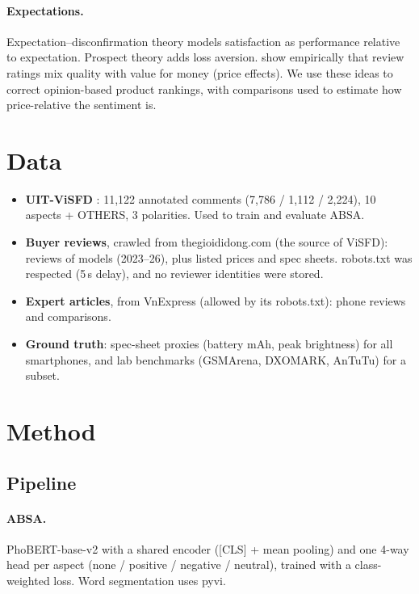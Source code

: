 \documentclass{article}
\begin{document}
\paragraph{Expectations.} Expectation--disconfirmation theory \citep{oliver1980} models satisfaction as performance relative to expectation.
Prospect theory \citep{kt1979} adds loss aversion. \citet{lihitt2010} show empirically that review ratings mix quality with value for money
(price effects). We use these ideas to correct opinion-based product rankings, with comparisons used to estimate how price-relative the sentiment is.

\section{Data}
\begin{itemize}
\item \textbf{UIT-ViSFD} \citep{visfd}: 11{,}122 annotated comments (7{,}786 / 1{,}112 / 2{,}224), 10 aspects + OTHERS, 3 polarities. Used to train and evaluate ABSA.
\item \textbf{Buyer reviews}, crawled from thegioididong.com (the source of ViSFD):  reviews of  models (2023--26),
plus listed prices and spec sheets. robots.txt was respected (5\,s delay), and no reviewer identities were stored.
\item \textbf{Expert articles}, from VnExpress (allowed by its robots.txt): phone reviews and comparisons. 
\item \textbf{Ground truth}: spec-sheet proxies (battery mAh, peak brightness) for all smartphones, and lab benchmarks
(GSMArena, DXOMARK, AnTuTu) for a subset. 
\end{itemize}

\section{Method}
\subsection{Pipeline}
\begin{center}
\pipeline
\end{center}
\paragraph{ABSA.} PhoBERT-base-v2 with a shared encoder ([CLS] + mean pooling) and one 4-way head per aspect (none / positive / negative / neutral),
trained with a class-weighted loss. Word segmentation uses pyvi.
\end{document}
